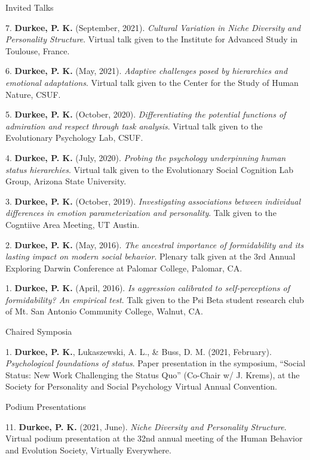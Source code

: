 \documentclass[10pt,]{article}
\begin{document}
\textcolor{light-gray}{Invited Talks}

7. \hangindent=0.5in \textbf{Durkee, P. K.} (September, 2021).
\emph{Cultural Variation in Niche Diversity and Personality Structure}.
Virtual talk given to the Institute for Advanced Study in Toulouse,
France.

6. \hangindent=0.5in \textbf{Durkee, P. K.} (May, 2021). \emph{Adaptive
challenges posed by hierarchies and emotional adaptations}. Virtual talk
given to the Center for the Study of Human Nature, CSUF.

5. \hangindent=0.5in \textbf{Durkee, P. K.} (October, 2020).
\emph{Differentiating the potential functions of admiration and respect
through task analysis}. Virtual talk given to the Evolutionary
Psychology Lab, CSUF.

4. \hangindent=0.5in \textbf{Durkee, P. K.} (July, 2020). \emph{Probing
the psychology underpinning human status hierarchies}. Virtual talk
given to the Evolutionary Social Cognition Lab Group, Arizona State
University.

3. \hangindent=0.5in \textbf{Durkee, P. K.} (October, 2019).
\emph{Investigating associations between individual differences in
emotion parameterization and personality}. Talk given to the Cogntiive
Area Meeting, UT Austin.

2. \hangindent=0.5in \textbf{Durkee, P. K.} (May, 2016). \emph{The
ancestral importance of formidability and its lasting impact on modern
social behavior}. Plenary talk given at the 3rd Annual Exploring Darwin
Conference at Palomar College, Palomar, CA.

1. \hangindent=0.5in \textbf{Durkee, P. K.} (April, 2016). \emph{Is
aggression calibrated to self-perceptions of formidability? An empirical
test}. Talk given to the Psi Beta student research club of Mt. San
Antonio Community College, Walnut, CA.

\textcolor{light-gray}{Chaired Symposia}

1. \hangindent=0.5in \textbf{Durkee, P. K.}, Lukaszewski, A. L., \&
Buss, D. M. (2021, February). \emph{Psychological foundations of
status}. Paper presentation in the symposium, ``Social Status: New Work
Challenging the Status Quo'' (Co-Chair w/ J. Krems), at the Society for
Personality and Social Psychology Virtual Annual Convention.

\textcolor{light-gray}{Podium Presentations}

11. \hangindent=0.5in \textbf{Durkee, P. K.} (2021, June). \emph{Niche
Diversity and Personality Structure}. Virtual podium presentation at the
32nd annual meeting of the Human Behavior and Evolution Society,
Virtually Everywhere.
\end{document}
